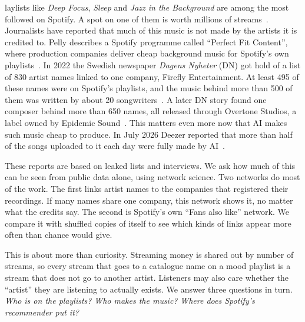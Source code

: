 \documentclass[9pt,twocolumn,twoside]{pnas-new}
\begin{document}

\maketitle
\thispagestyle{firststyle}

\Firstpage

laylists like \emph{Deep Focus}, \emph{Sleep} and \emph{Jazz in the Background} are among the most followed on Spotify. A spot on one of them is worth millions of streams~\cite{aguiar2021platforms,eriksson2019teardown}. Journalists have reported that much of this music is not made by the artists it is credited to. Pelly describes a Spotify programme called ``Perfect Fit Content'', where production companies deliver cheap background music for Spotify's own playlists~\cite{pelly2025harpers,pelly2025mood}. In 2022 the Swedish newspaper \emph{Dagens Nyheter} (DN) got hold of a list of 830 artist names linked to one company, Firefly Entertainment. At least 495 of these names were on Spotify's playlists, and the music behind more than 500 of them was written by about 20 songwriters~\cite{ingham2022mbw}. A later DN story found one composer behind more than 650 names, all released through Overtone Studios, a label owned by Epidemic Sound~\cite{stassen2024mbw}. This matters even more now that AI makes such music cheap to produce. In July 2026 Deezer reported that more than half of the songs uploaded to it each day were fully made by AI~\cite{techcrunch2026deezer}.

These reports are based on leaked lists and interviews. We ask how much of this can be seen from public data alone, using network science. Two networks do most of the work. The first links artist names to the companies that registered their recordings. If many names share one company, this network shows it, no matter what the credits say. The second is Spotify's own ``Fans also like'' network. We compare it with shuffled copies of itself to see which kinds of links appear more often than chance would give.

This is about more than curiosity. Streaming money is shared out by number of streams, so every stream that goes to a catalogue name on a mood playlist is a stream that does not go to another artist. Listeners may also care whether the ``artist'' they are listening to actually exists. We answer three questions in turn. \emph{Who is on the playlists?} \emph{Who makes the music?} \emph{Where does Spotify's recommender put it?}\Endparasplit
\end{document}
